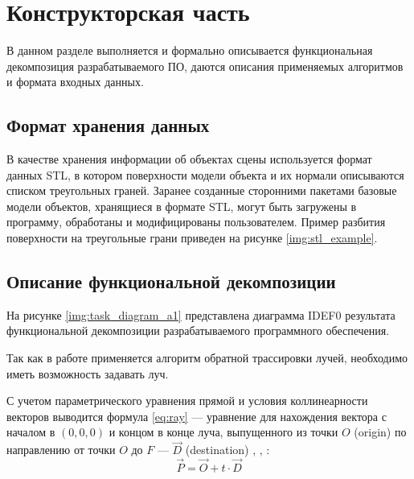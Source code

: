 \chapter{Конструкторская часть}

В данном разделе выполняется и формально описывается функциональная декомпозиция разрабатываемого ПО, даются описания применяемых алгоритмов и формата входных данных.

\section{Формат хранения данных}

В качестве хранения информации об объектах сцены используется формат данных STL, в котором поверхности модели объекта и их нормали описываются списком треугольных граней.
Заранее созданные сторонними пакетами базовые модели объектов, хранящиеся в формате STL, могут быть загружены в программу, обработаны и модифицированы пользователем.
Пример разбития поверхности на треугольные грани приведен на рисунке \ref{img:stl_example}.



\section{Описание функциональной декомпозиции}

На рисунке \ref{img:task_diagram_a1} представлена диаграмма IDEF0 результата функциональной декомпозиции разрабатываемого программного обеспечения.



Так как в работе применяется алгоритм обратной трассировки лучей, необходимо иметь возможность задавать луч.

С учетом параметрического уравнения прямой и условия коллинеарности векторов выводится формула \ref{eq:ray} --- уравнение для нахождения вектора с началом в $(0, 0, 0)$ и концом в конце луча, выпущенного из точки $O$ (origin) по направлению от точки $O$ до $F$ --- $\overrightarrow{D}$ (destination) \cite{божко2007компьютерная}, \cite{роджерс}, \cite{боресков}:
\begin{equation}\label{eq:ray}
	\overrightarrow{P} = \overrightarrow{O} + t \cdot \overrightarrow{D}
\end{equation}

